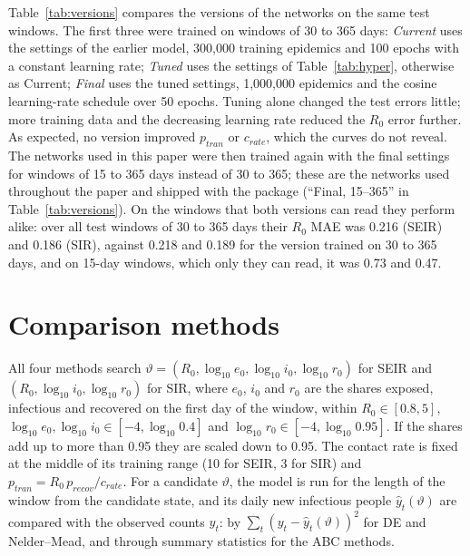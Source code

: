\documentclass[12pt]{article}
\begin{document}
Table~\ref{tab:versions} compares the versions of the networks on the same test windows. The first three were
trained on windows of 30 to 365 days: \emph{Current} uses the settings of the earlier model, 300,000 training
epidemics and 100 epochs with a constant learning rate; \emph{Tuned} uses the settings of
Table~\ref{tab:hyper}, otherwise as Current; \emph{Final} uses the tuned settings, 1,000,000 epidemics and the
cosine learning-rate schedule over 50 epochs. Tuning alone changed the test errors little; more training data and the
decreasing learning rate reduced the $R_0$ error further. As expected, no version improved $p_{tran}$ or
$c_{rate}$, which the curves do not reveal. The networks used in this paper were then trained again with the final
settings for windows of 15 to 365 days instead of 30 to 365; these are the networks used throughout the paper and
shipped with the package (``Final, 15--365'' in Table~\ref{tab:versions}). On the windows that both versions can
read they perform alike: over all test windows of 30 to 365 days their $R_0$ MAE was 0.216 (SEIR) and 0.186 (SIR),
against 0.218 and 0.189 for the version trained on 30 to 365 days, and on 15-day windows, which only they can read,
it was 0.73 and 0.47.

\begin{table}[htbp]
\centering
\caption{Mean absolute error of $R_0$, $p_{tran}$ and $c_{rate}$ of the versions of the networks (5 networks
each) on the same test windows: 61-day windows from the beginning of the test epidemics, all test windows of 30 to
365 days (at the beginning, middle and end), which every version can read, and, for the final networks trained on
windows of 15 to 365 days (the networks of this paper), 15-day windows.}
\label{tab:versions}
\small

\end{table}

\section{Comparison methods}\label{app:baselines}

All four methods search $\vartheta = (R_0, \log_{10} e_0, \log_{10} i_0, \log_{10} r_0)$ for SEIR and
$(R_0, \log_{10} i_0, \log_{10} r_0)$ for SIR, where $e_0$, $i_0$ and $r_0$ are the shares exposed,
infectious and recovered on the first day of the window, within $R_0\in[0.8, 5]$,
$\log_{10} e_0, \log_{10} i_0 \in [-4, \log_{10} 0.4]$ and $\log_{10} r_0 \in [-4, \log_{10} 0.95]$. If the
shares add up to more than 0.95 they are scaled down to 0.95. The contact rate is fixed at the middle of its
training range (10 for SEIR, 3 for SIR) and $p_{tran} = R_0\, p_{recov}/c_{rate}$. For a candidate
$\vartheta$, the model is run for the length of the window from the candidate state, and its daily new
infectious people $\hat y_t(\vartheta)$ are compared with the observed counts $y_t$: by
$\sum_t (y_t - \hat y_t(\vartheta))^2$ for DE and Nelder--Mead, and through summary statistics for the ABC
methods.
\end{document}
